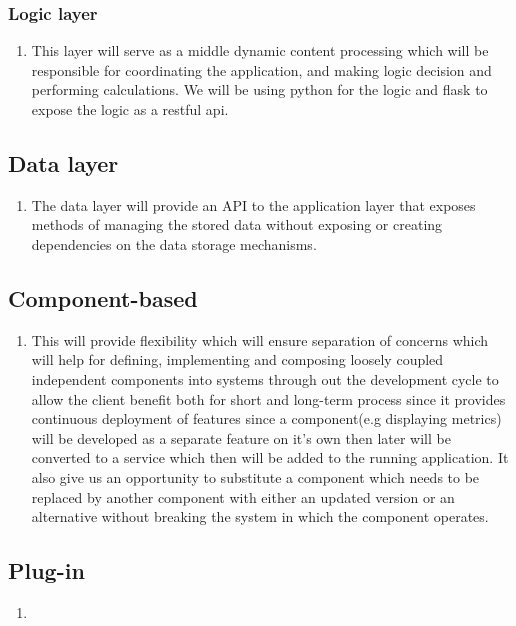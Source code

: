 \documentclass{article}
\begin{document}
        \subsubsection{Logic layer}
            \begin{enumerate}
                \item This layer will serve as a middle dynamic content processing which will be responsible for coordinating the application, and making logic decision and performing calculations. We will be using python for the logic and flask to expose the logic as a restful api.
            \end{enumerate}
        \subsection{Data layer}
            \begin{enumerate}
                \item The data layer will provide an API to the application layer that exposes methods of managing the stored data without exposing or creating dependencies on the data storage mechanisms.
            \end{enumerate}
            
        \subsection{Component-based}
            \begin{enumerate}
                \item This will provide flexibility  which will ensure separation of concerns which will help for defining, implementing and composing loosely coupled independent components into systems through out the development cycle to allow the client benefit both for short and long-term process since it provides continuous deployment of features since a component(e.g displaying metrics) will be developed as a separate feature on it's own then later will be converted to a service which then will be added to the running application. It also give us an opportunity to substitute a component which needs to be replaced by another component with either an updated version or an alternative without breaking the system in which the component operates.
            \end{enumerate}
        \subsection{Plug-in}
            \begin{enumerate}
                \item 
            \end{enumerate}
\end{document}
